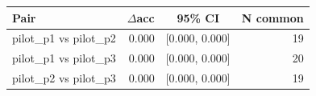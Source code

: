\begin{tabular}{lrcr}
\toprule
Pair & $\Delta$acc & 95\% CI & N common \\
\midrule
pilot_p1 vs pilot_p2 & 0.000 & [0.000, 0.000] & 19 \\
pilot_p1 vs pilot_p3 & 0.000 & [0.000, 0.000] & 20 \\
pilot_p2 vs pilot_p3 & 0.000 & [0.000, 0.000] & 19 \\
\bottomrule
\end{tabular}
